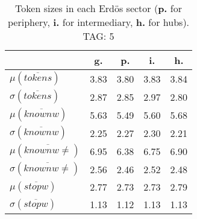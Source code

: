 \begin{table}[h!]
\begin{center}
\begin{tabular}{| l || c | c | c | c |}\hline
 & {\bf g.} & {\bf p.} & {\bf i.} & {\bf h.} \\\hline\hline
$\mu(\overline{tokens})$ & 3.83  & 3.80  & 3.83  & 3.84 \\
$\sigma(\overline{tokens})$ & 2.87  & 2.85  & 2.97  & 2.80 \\\hline
$\mu(\overline{knownw})$ & 5.63  & 5.49  & 5.60  & 5.68 \\
$\sigma(\overline{knownw})$ & 2.25  & 2.27  & 2.30  & 2.21 \\\hline
$\mu(\overline{knownw \neq})$ & 6.95  & 6.38  & 6.75  & 6.90 \\
$\sigma(\overline{knownw \neq})$ & 2.56  & 2.46  & 2.52  & 2.48 \\\hline
$\mu(\overline{stopw})$ & 2.77  & 2.73  & 2.73  & 2.79 \\
$\sigma(\overline{stopw})$ & 1.13  & 1.12  & 1.13  & 1.13 \\\hline
\end{tabular}
\caption{Token sizes in each Erd\"os sector ({{\bf p.}} for periphery, {{\bf i.}} for intermediary, {{\bf h.}} for hubs). TAG: 5}
\end{center}
\end{table}
